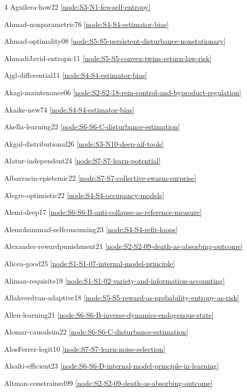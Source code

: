 \documentclass[10pt]{article}
\begin{document}
{\begin{multicols}{4}
Aguilera-how22 \hfill \ref{node:S3-N1-fep-self-entropy}\par
Ahmad-nonparametric76 \hfill \ref{node:S4-S4-estimator-bias}\par
Ahmad-optimality08 \hfill \ref{node:S5-S5-persistent-disturbance-nonstationary}\par
AhmadiJavid-entropic11 \hfill \ref{node:S5-S5-convex-twins-return-law-risk}\par
Ajgl-differential11 \hfill \ref{node:S4-S4-estimator-bias}\par
Akagi-maintenance06 \hfill \ref{node:S2-S2-18-rein-control-and-byproduct-regulation}\par
Akaike-new74 \hfill \ref{node:S4-S4-estimator-bias}\par
Akella-learning22 \hfill \ref{node:S6-S6-C-disturbance-estimation}\par
Akgul-distributional26 \hfill \ref{node:S3-N10-deep-aif-tools}\par
Alatur-independent24 \hfill \ref{node:S7-S7-learn-potential}\par
Albarracin-epistemic22 \hfill \ref{node:S7-S7-collective-swarm-surprise}\par
Alegre-optimistic22 \hfill \ref{node:S4-S4-occupancy-models}\par
Alemi-deep17 \hfill \ref{node:S6-S6-B-anti-collapse-as-reference-measure}\par
Alemohammad-selfconsuming23 \hfill \ref{node:S4-S4-refit-loops}\par
Alexander-rewardpunishment21 \hfill \ref{node:S2-S2-09-death-as-absorbing-outcome}\par
Alicea-good25 \hfill \ref{node:S1-S1-07-internal-model-principle}\par
Aliman-requisite19 \hfill \ref{node:S1-S1-02-variety-and-information-accounting}\par
Allahverdyan-adaptive18 \hfill \ref{node:S5-S5-reward-as-probability-entropy-as-risk}\par
Allen-learning21 \hfill \ref{node:S6-S6-B-inverse-dynamics-endogenous-state}\par
Alomar-causalsim22 \hfill \ref{node:S6-S6-C-disturbance-estimation}\par
AlosFerrer-logit10 \hfill \ref{node:S7-S7-learn-noise-selection}\par
Alsalti-efficient23 \hfill \ref{node:S6-S6-D-internal-model-principle-in-learning}\par
Altman-constrained99 \hfill \ref{node:S2-S2-09-death-as-absorbing-outcome}\par

\end{multicols}}
\end{document}
